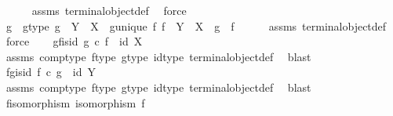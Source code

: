 \begin{isabellebody}
\ \ \ \ \isamarkupfalse%
\ assms{\isacharparenleft}{\kern0pt}{}{\isacharparenright}{\kern0pt}\ terminal{\isacharunderscore}{\kern0pt}object{\isacharunderscore}{\kern0pt}def\ \isamarkupfalse%
\ force\isanewline
\isanewline
\ \ \isamarkupfalse%
\ g\ \ g{\isacharunderscore}{\kern0pt}type{\isacharcolon}{\kern0pt}\ {\isachardoublequoteopen}g\ {\isacharcolon}{\kern0pt}\ Y\ {\isasymrightarrow}\ X{\isachardoublequoteclose}\ \ g{\isacharunderscore}{\kern0pt}unique{\isacharcolon}{\kern0pt}\ {\isachardoublequoteopen}{\isasymforall}f{\isachardot}{\kern0pt}\ f\ {\isacharcolon}{\kern0pt}\ Y\ {\isasymrightarrow}\ X\ {\isasymlongrightarrow}\ g\ {\isacharequal}{\kern0pt}\ f{\isachardoublequoteclose}\isanewline
\ \ \ \ \isamarkupfalse%
\ assms{\isacharparenleft}{\kern0pt}{}{\isacharparenright}{\kern0pt}\ terminal{\isacharunderscore}{\kern0pt}object{\isacharunderscore}{\kern0pt}def\ \isamarkupfalse%
\ force\isanewline
\isanewline
\ \ \isamarkupfalse%
\ g{\isacharunderscore}{\kern0pt}f{\isacharunderscore}{\kern0pt}is{\isacharunderscore}{\kern0pt}id{\isacharcolon}{\kern0pt}\ {\isachardoublequoteopen}g\ {\isasymcirc}\isactrlsub c\ f\ {\isacharequal}{\kern0pt}\ id\ X{\isachardoublequoteclose}\isanewline
\ \ \ \ \isamarkupfalse%
\ assms{\isacharparenleft}{\kern0pt}{}{\isacharparenright}{\kern0pt}\ comp{\isacharunderscore}{\kern0pt}type\ f{\isacharunderscore}{\kern0pt}type\ g{\isacharunderscore}{\kern0pt}type\ id{\isacharunderscore}{\kern0pt}type\ terminal{\isacharunderscore}{\kern0pt}object{\isacharunderscore}{\kern0pt}def\ \isamarkupfalse%
\ blast\isanewline
\isanewline
\ \ \isamarkupfalse%
\ f{\isacharunderscore}{\kern0pt}g{\isacharunderscore}{\kern0pt}is{\isacharunderscore}{\kern0pt}id{\isacharcolon}{\kern0pt}\ {\isachardoublequoteopen}f\ {\isasymcirc}\isactrlsub c\ g\ {\isacharequal}{\kern0pt}\ id\ Y{\isachardoublequoteclose}\isanewline
\ \ \ \ \isamarkupfalse%
\ assms{\isacharparenleft}{\kern0pt}{}{\isacharparenright}{\kern0pt}\ comp{\isacharunderscore}{\kern0pt}type\ f{\isacharunderscore}{\kern0pt}type\ g{\isacharunderscore}{\kern0pt}type\ id{\isacharunderscore}{\kern0pt}type\ terminal{\isacharunderscore}{\kern0pt}object{\isacharunderscore}{\kern0pt}def\ \isamarkupfalse%
\ blast\isanewline
\isanewline
\ \ \isamarkupfalse%
\ f{\isacharunderscore}{\kern0pt}isomorphism{\isacharcolon}{\kern0pt}\ {\isachardoublequoteopen}isomorphism\ f{\isachardoublequoteclose}\isanewline

\end{isabellebody}
